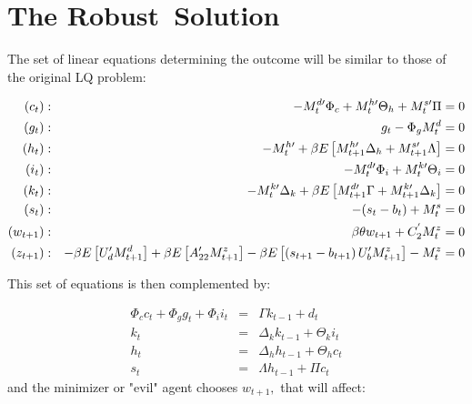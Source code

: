 \documentclass[letter, fleqn, 11pt]{article}
\begin{document}
\section{The Robust\ Solution}

The set of linear equations determining the outcome will be similar to those of the
original LQ problem:

\begin{eqnarray}
\left( c_{t}\right)  &:&-{\scriptsize M}_{t}^{d\prime }\Phi _{c}+%
{\scriptsize M}_{t}^{h\prime }\Theta _{h}+{\scriptsize M}_{t}^{s\prime }\Pi
=0  \label{SYSTEM1} \\
\left( g_{t}\right)  &:&g_{t}-\Phi _{g}{\scriptsize M}_{t}^{d}=0  \notag \\
\left( h_{t}\right)  &:&-{\scriptsize M}_{t}^{h\prime }+\beta E\left[
{\scriptsize M}_{t+1}^{h\prime }\Delta _{h}+{\scriptsize M}_{t+1}^{s\prime
}\Lambda \right] =0  \notag \\
\left( i_{t}\right)  &:&-{\scriptsize M}_{t}^{d\prime }\Phi _{i}+%
{\scriptsize M}_{t}^{k\prime }\Theta _{i}=0  \notag \\
\left( k_{t}\right)  &:&-{\scriptsize M}_{t}^{k\prime }\Delta _{k}+\beta E%
\left[ {\scriptsize M}_{t+1}^{d\prime }\Gamma +{\scriptsize M}%
_{t+1}^{k\prime }\Delta _{k}\right] =0  \notag \\
\left( s_{t}\right)  &:&-(s_{t}-b_{t})+{\scriptsize M}_{t}^{s}=0  \notag \\
\left( w_{t+1}\right)  &:&\beta \theta w_{t+1}+C_{2}^{^{\prime }}%
{\scriptsize M}_{t}^{z}=0  \notag \\
\left( z_{t+1}\right)  &:&-\beta E\left[ U_{d}^{\prime }{\scriptsize M}%
_{t+1}^{d}\right] +\beta E\left[ A_{22}^{\prime }{\scriptsize M}_{t+1}^{z}%
\right] -\beta E\left[ \left( s_{t+1}-b_{t+1}\right) U_{b}^{\prime }%
{\scriptsize M}_{t+1}^{z}\right] -{\scriptsize M}_{t}^{z}=0  \notag
\end{eqnarray}

This set of equations is then complemented by:

\begin{eqnarray*}
\Phi _{c}c_{t}+\Phi _{g}g_{t}+\Phi _{i}i_{t} &=&\Gamma k_{t-1}+d_{t} \\
k_{t} &=&\Delta _{k}k_{t-1}+\Theta _{k}i_{t} \\
h_{t} &=&\Delta _{h}h_{t-1}+\Theta _{h}c_{t} \\
s_{t} &=&\Lambda h_{t-1}+\Pi c_{t}
\end{eqnarray*}%
and the minimizer or "evil" agent chooses $w_{t+1},$ that will affect:
\end{document}

